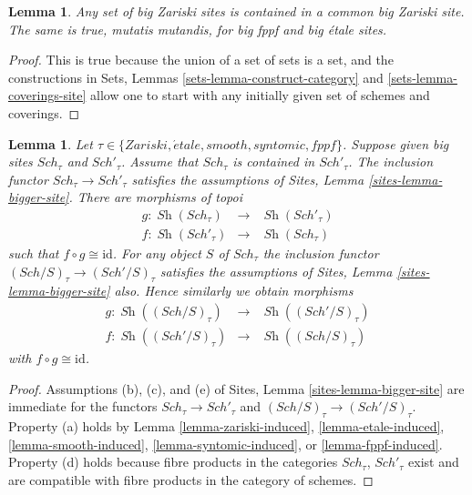 \documentclass{stacks-project}
\theoremstyle{plain}
\newtheorem{lemma}[subsection]{Lemma}
\theoremstyle{definition}
\theoremstyle{remark}
\numberwithin{equation}{subsection}
\def\Sch{\mathit{Sch}}
\def\Sh{\mathop{\mathit{Sh}}\nolimits}
\def\etale{{\acute{e}tale}}
\begin{document}
\begin{lemma}
\label{lemma-contained-in}
Any set of big Zariski sites is contained in a common big Zariski site.
The same is true, mutatis mutandis, for big fppf and big \'etale sites.
\end{lemma}

\begin{proof}
This is true because the union of a set of sets is a set, and the
constructions in Sets, Lemmas \ref{sets-lemma-construct-category} and
\ref{sets-lemma-coverings-site}
allow one to start with any initially given set of schemes
and coverings.
\end{proof}

\begin{lemma}
\label{lemma-change-alpha}
Let $\tau \in \{Zariski, \etale, smooth, syntomic, fppf\}$.
Suppose given big sites $\Sch_\tau$ and $\Sch'_\tau$.
Assume that $\Sch_\tau$ is contained in $\Sch'_\tau$.
The inclusion functor $\Sch_\tau \to \Sch'_\tau$ satisfies
the assumptions of Sites, Lemma \ref{sites-lemma-bigger-site}.
There are morphisms of topoi
\begin{eqnarray*}
g : \Sh(\Sch_\tau) &
\longrightarrow &
\Sh(\Sch'_\tau) \\
f : \Sh(\Sch'_\tau) &
\longrightarrow &
\Sh(\Sch_\tau)
\end{eqnarray*}
such that $f \circ g \cong \text{id}$. For any object $S$
of $\Sch_\tau$ the inclusion functor
$(\Sch/S)_\tau \to (\Sch'/S)_\tau$ satisfies
the assumptions of Sites, Lemma \ref{sites-lemma-bigger-site}
also. Hence similarly we obtain morphisms
\begin{eqnarray*}
g : \Sh((\Sch/S)_\tau) &
\longrightarrow &
\Sh((\Sch'/S)_\tau) \\
f : \Sh((\Sch'/S)_\tau) &
\longrightarrow &
\Sh((\Sch/S)_\tau)
\end{eqnarray*}
with $f \circ g \cong \text{id}$.
\end{lemma}

\begin{proof}
Assumptions (b), (c), and (e) of
Sites, Lemma \ref{sites-lemma-bigger-site}
are immediate for the functors
$\Sch_\tau \to \Sch'_\tau$ and
$(\Sch/S)_\tau \to (\Sch'/S)_\tau$. Property (a) holds by
Lemma \ref{lemma-zariski-induced},
\ref{lemma-etale-induced},
\ref{lemma-smooth-induced},
\ref{lemma-syntomic-induced}, or
\ref{lemma-fppf-induced}.
Property (d) holds because
fibre products in the categories $\Sch_\tau$, $\Sch'_\tau$
exist and are compatible with fibre products in the category of schemes.
\end{proof}
\end{document}
